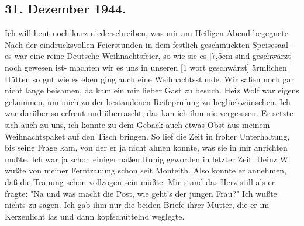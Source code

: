 \subsection{31. Dezember 1944.}

Ich will heut noch kurz niederschreiben, was mir am Heiligen Abend begegnete.
Nach der eindrucksvollen Feierstunden in dem festlich geschm\"{u}ckten Speisesaal - es war eine reine Deutsche Weihnachtsfeier, so wie sie es {\color{red} [7,5cm sind geschw\"{a}rzt] noch gewesen ist- machten wir es uns in unseren [1 wort geschw\"{a}rzt] } \"{a}rmlichen H\"{u}tten so gut wie es eben ging auch eine Weihnachtsstunde.
Wir sa{\ss}en noch gar nicht lange beisamen, da kam ein mir lieber Gast zu besuch.
Heiz Wolf war eigens gekommen, um mich zu der bestandenen Reifepr\"{u}fung zu begl\"{u}ckw\"{u}nschen.
Ich war dar\"{u}ber so erfreut und \"{u}berrascht, das kan ich ihm nie vergesssen.
Er setzte sich auch zu uns, ich konnte zu dem Geb\"{a}ck auch etwas Obst aus meinem Weihnachtspaket auf den Tisch bringen.
So lief die Zeit in froher Unterhaltung, bis seine Frage kam, von der er ja nicht ahnen konnte, was sie in mir anrichten mu{\ss}te.
Ich war ja schon einigerma{\ss}en Ruhig geworden in letzter Zeit.
Heinz W. wu{\ss}te von meiner Ferntrauung schon seit Monteith.
Also konnte er annehmen, da{\ss} die Trauung schon vollzogen sein m\"{u}{\ss}te.
Mir stand das Herz still als er fragte: "Na und was macht die Post, wie geht's der jungen Frau?"
Ich wu{\ss}te nichts zu sagen.
Ich gab ihm nur die beiden Briefe ihrer Mutter, die er im Kerzenlicht las und dann kopfsch\"{u}ttelnd weglegte.

\clearpage
